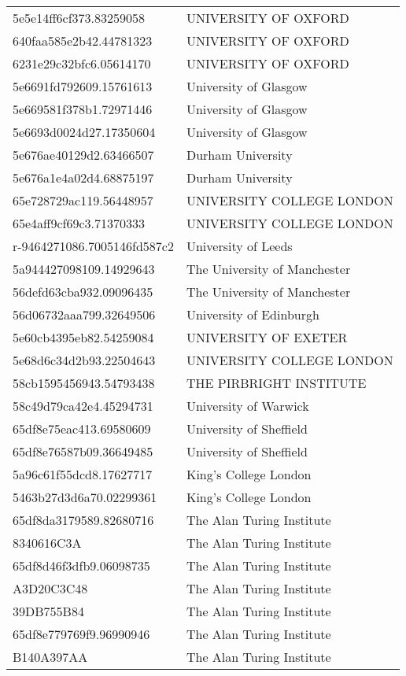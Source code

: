 \begin{tabular}{ll}
5e5e14ff6cf373.83259058 & UNIVERSITY OF OXFORD \\
640faa585e2b42.44781323 & UNIVERSITY OF OXFORD \\
6231e29c32bfc6.05614170 & UNIVERSITY OF OXFORD \\
5e6691fd792609.15761613 & University of Glasgow \\
5e669581f378b1.72971446 & University of Glasgow \\
5e6693d0024d27.17350604 & University of Glasgow \\
5e676ae40129d2.63466507 & Durham University \\
5e676a1e4a02d4.68875197 & Durham University \\
65e728729ac119.56448957 & UNIVERSITY COLLEGE LONDON \\
65e4aff9cf69c3.71370333 & UNIVERSITY COLLEGE LONDON \\
r-9464271086.7005146fd587c2 & University of Leeds \\
5a944427098109.14929643 & The University of Manchester \\
56defd63cba932.09096435 & The University of Manchester \\
56d06732aaa799.32649506 & University of Edinburgh \\
5e60cb4395eb82.54259084 & UNIVERSITY OF EXETER \\
5e68d6c34d2b93.22504643 & UNIVERSITY COLLEGE LONDON \\
58cb1595456943.54793438 & THE PIRBRIGHT INSTITUTE \\
58c49d79ca42e4.45294731 & University of Warwick \\
65df8e75eac413.69580609 & University of Sheffield \\
65df8e76587b09.36649485 & University of Sheffield \\
5a96c61f55dcd8.17627717 & King's College London \\
5463b27d3d6a70.02299361 & King's College London \\
65df8da3179589.82680716 & The Alan Turing Institute \\
8340616C3A & The Alan Turing Institute \\
65df8d46f3dfb9.06098735 & The Alan Turing Institute \\
A3D20C3C48 & The Alan Turing Institute \\
39DB755B84 & The Alan Turing Institute \\
65df8e779769f9.96990946 & The Alan Turing Institute \\
B140A397AA & The Alan Turing Institute \\

\end{tabular}
